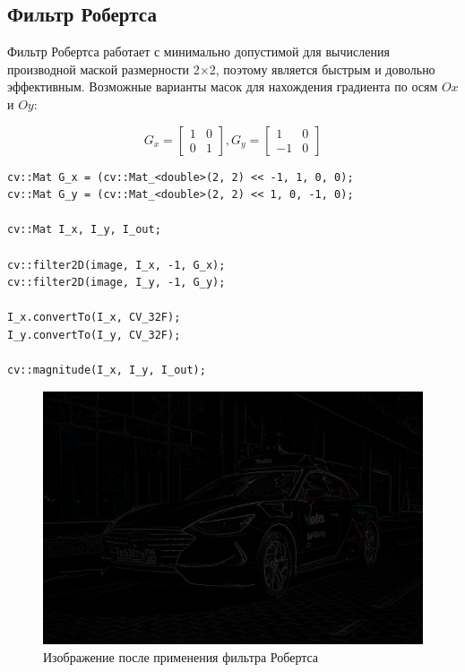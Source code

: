 \subsection{Фильтр Робертса}

Фильтр Робертса работает с минимально допустимой для вычисления производной маской размерности 
2×2, поэтому является быстрым и довольно эффективным. Возможные варианты масок
для нахождения градиента по осям $Ox$ и $Oy$:

\begin{equation}
    G_x = \begin{bmatrix}
        1 & 0 \\
        0 & 1 
    \end{bmatrix}, 
    G_y = \begin{bmatrix}
        1 & 0 \\
        -1 & 0 
    \end{bmatrix}
\end{equation}

\begin{lstlisting}[style=cpp_white, caption={Исходный код фильтра Робертса}]
cv::Mat G_x = (cv::Mat_<double>(2, 2) << -1, 1, 0, 0);
cv::Mat G_y = (cv::Mat_<double>(2, 2) << 1, 0, -1, 0);

cv::Mat I_x, I_y, I_out;

cv::filter2D(image, I_x, -1, G_x);
cv::filter2D(image, I_y, -1, G_y);

I_x.convertTo(I_x, CV_32F);
I_y.convertTo(I_y, CV_32F);

cv::magnitude(I_x, I_y, I_out);
\end{lstlisting}

\begin{figure}[ht]
    \centering
    \includegraphics[width=\textwidth]{../outputs/roberts_operator.png}
    \caption{Изображение после применения фильтра Робертса}
    \label{fig:stitch_images}
\end{figure}

